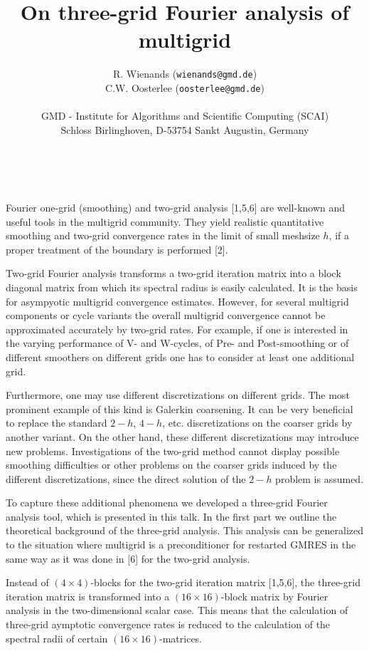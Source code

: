 \documentclass[11pt]{article}
\date{ ~ \hspace{-4mm}}
\title{On three-grid Fourier analysis of multigrid  }
\author{R. Wienands ({\tt wienands@gmd.de}) \\ C.W. Oosterlee ({\tt oosterlee@gmd.de}) \\ \\ GMD - Institute for Algorithms and Scientific Computing (SCAI)  \\  Schloss Birlinghoven, D-53754 Sankt Augustin, Germany  \\}
\begin{document}
\maketitle
\thispagestyle{empty}





 



Fourier one-grid (smoothing) and two-grid analysis [1,5,6] are well-known 
and useful tools in the multigrid community.
They yield realistic quantitative smoothing and two-grid convergence rates
in the limit of small meshsize $h$, if a proper treatment of the boundary
is performed [2].

Two-grid Fourier analysis transforms a two-grid iteration matrix into a
block diagonal matrix from which its spectral radius is easily calculated.
It is the basis for asympyotic multigrid convergence estimates. 
However, for several multigrid components or cycle variants the overall
multigrid convergence cannot be approximated accurately by two-grid rates.
For example, if one is interested in the varying performance of 
V- and W-cycles, of Pre- and Post-smoothing or of different smoothers
on different grids one has to consider at least one additional grid. 

Furthermore, one may use different discretizations on different grids.
The most prominent example of this kind is Galerkin coarsening.
It can be very beneficial to replace the standard 
$2-h$, $4-h$, etc. discretizations on the coarser grids by another
variant. On the other hand, these different discretizations may introduce
new problems.
Investigations of the two-grid method cannot display possible
smoothing difficulties or other problems on the coarser grids induced by the
different discretizations, since the direct solution of the $2-h$ problem
is assumed. 

To capture these additional phenomena we developed a three-grid
Fourier analysis tool, which is presented in this talk. 
In the first part we outline the theoretical background of the
three-grid analysis. This analysis can be generalized to the situation where
multigrid is a preconditioner for restarted GMRES in the same way as it was
done in [6] for the two-grid analysis.

Instead of $(4 \times 4)$-blocks for the two-grid iteration matrix [1,5,6], the
three-grid iteration matrix is transformed into a $(16 \times 16)$-block 
matrix by Fourier analysis in the two-dimensional scalar case. This means
that the calculation of three-grid aymptotic convergence rates is reduced
to the calculation of the spectral radii of certain $(16 \times 16)$-matrices.
\end{document}
